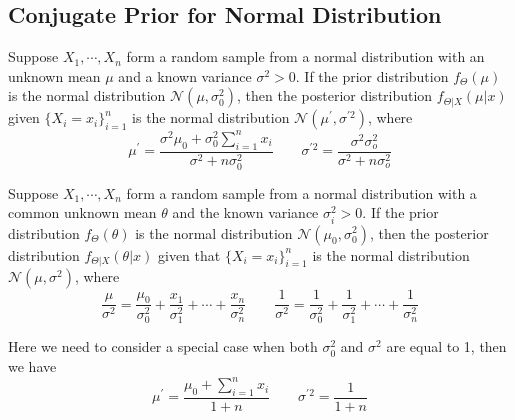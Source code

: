 \subsection{Conjugate Prior for Normal Distribution}
\begin{definition}
  Suppose \(X_1, \cdots, X_n\) form a random sample from a normal distribution with an unknown mean \(\mu\) and a known variance \(\sigma^2 > 0\). If the prior distribution \(f_{\Theta}(\mu)\) is the normal distribution \(\mathcal{N} (\mu, \sigma_0^2)\), then the posterior distribution \(f_{\Theta \vert X} (\mu \vert x)\) given \(\{X_i = x_i\}_{i=1} ^n\) is the normal distribution \(\mathcal{N}(\mu^{\prime}, \sigma^{\prime2})\), where 
  \[
    \mu^{\prime} = \dfrac{\sigma^2\mu_0 + \sigma_0^2 \sum_{i = 1}^n x_i}{\sigma^2 + n\sigma_0^2} \quad\quad \sigma^{\prime2} = \dfrac{\sigma^2\sigma_o^2}{\sigma^2 + n\sigma_o^2}
  \] 
\end{definition}

\begin{definition}
  Suppose \(X_1, \cdots, X_n\) form a random sample from a normal distribution with a common unknown mean \(\theta\) and the known variance \(\sigma_i^2 > 0\). If the prior distribution \(f_{\Theta}(\theta)\) is the normal distribution \(\mathcal{N} (\mu_0, \sigma_0^2)\), then the posterior distribution \(f_{\Theta \vert X} (\theta \vert x)\) given that \(\{X_i = x_i\}_{i=1} ^n\) is the normal distribution \(\mathcal{N}(\mu, \sigma^2)\), where 
  \[
    \dfrac{\mu}{\sigma^2} = \dfrac{\mu_0}{\sigma_0^2} + \dfrac{x_1}{\sigma_1^2} + \cdots + \dfrac{x_n}{\sigma_n^2} \quad\quad \dfrac{1}{\sigma^2} = \dfrac{1}{\sigma_0^2} + \dfrac{1}{\sigma_1^2} + \cdots + \dfrac{1}{\sigma_n^2}
  \] 
\end{definition}

Here we need to consider a special case when both \(\sigma_0^2\) and \(\sigma^2\) are equal to 1, then we have 
\[
  \mu^{\prime} = \dfrac{\mu_0 + \sum_{i = 1}^n x_i}{1 + n} \quad\quad \sigma^{\prime2} = \dfrac{1}{1 + n}
\]

